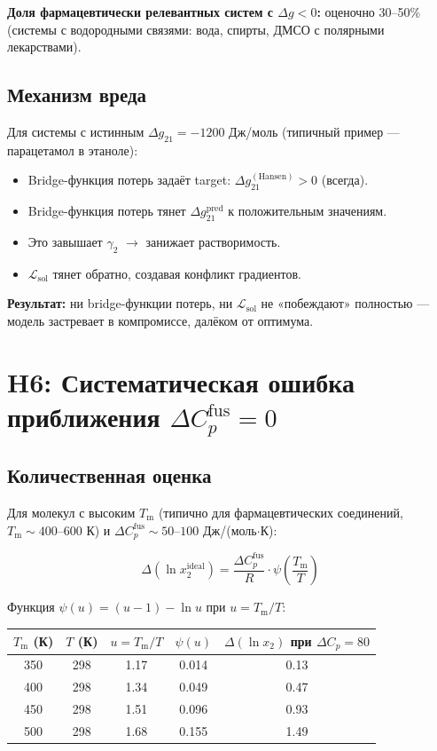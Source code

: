 \documentclass[11pt]{article}
\begin{document}
\textbf{Доля фармацевтически релевантных систем с $\Delta g < 0$:} оценочно 30--50\% (системы с водородными связями: вода, спирты, ДМСО с полярными лекарствами).

\subsection{Механизм вреда}

Для системы с истинным $\Delta g_{21} = -1200$ Дж/моль (типичный пример --- парацетамол в этаноле):

\begin{itemize}
  \item Bridge-функция потерь задаёт target: $\Delta g_{21}^{\mathrm{(Hansen)}} > 0$ (всегда).
  \item Bridge-функция потерь тянет $\Delta g_{21}^{\mathrm{pred}}$ к положительным значениям.
  \item Это завышает $\gamma_2$ $\to$ занижает растворимость.
  \item $\mathcal{L}_{\mathrm{sol}}$ тянет обратно, создавая конфликт градиентов.
\end{itemize}

\textbf{Результат:} ни bridge-функции потерь, ни $\mathcal{L}_{\mathrm{sol}}$ не «побеждают» полностью --- модель застревает в компромиссе, далёком от оптимума.

\section{H6: Систематическая ошибка приближения $\Delta C_p^{\mathrm{fus}} = 0$}

\subsection{Количественная оценка}

Для молекул с высоким $T_{\mathrm{m}}$ (типично для фармацевтических соединений, $T_{\mathrm{m}} \sim 400$--$600$ К) и $\Delta C_p^{\mathrm{fus}} \sim 50$--$100$ Дж/(моль$\cdot$К):

\begin{equation*}
\Delta(\ln x_2^{\mathrm{ideal}}) = \frac{\Delta C_p^{\mathrm{fus}}}{R} \cdot \psi\!\left(\frac{T_{\mathrm{m}}}{T}\right)
\end{equation*}

Функция $\psi(u) = (u - 1) - \ln u$ при $u = T_{\mathrm{m}}/T$:

\begin{center}
\begin{tabular}{|c|c|c|c|c|}
\hline
$T_{\mathrm{m}}$ (К) & $T$ (К) & $u = T_{\mathrm{m}}/T$ & $\psi(u)$ & $\Delta(\ln x_2)$ при $\Delta C_p = 80$ \\
\hline
350 & 298 & 1.17 & 0.014 & 0.13 \\
\hline
400 & 298 & 1.34 & 0.049 & 0.47 \\
\hline
450 & 298 & 1.51 & 0.096 & 0.93 \\
\hline
500 & 298 & 1.68 & 0.155 & 1.49 \\
\hline
\end{tabular}
\end{center}
\end{document}
